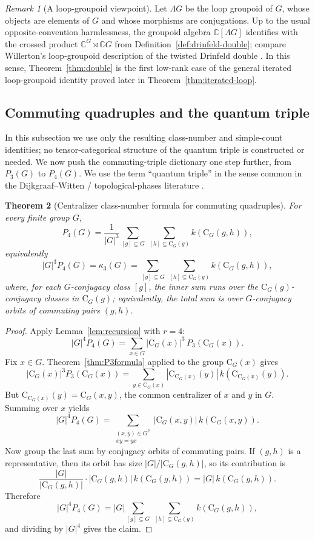 \documentclass[11pt]{article}
\newtheorem{theorem}{Theorem}[section]
\theoremstyle{definition}
\theoremstyle{remark}
\newtheorem{remark}[theorem]{Remark}
\theoremstyle{definition}
\theoremstyle{plain}
\newcommand{\C}{\mathrm{C}}
\begin{document}
\begin{remark}[A loop-groupoid viewpoint]\label{rem:double-as-loopgroupoid}
Let $\Lambda G$ be the loop groupoid of $G$, whose objects are elements of $G$ and whose morphisms are conjugations.
Up to the usual opposite-convention harmlessness, the groupoid algebra $\mathbb C[\Lambda G]$ identifies with the crossed product
$\mathbb C^G\rtimes \mathbb C G$ from Definition~\ref{def:drinfeld-double}; compare Willerton's loop-groupoid description of the twisted Drinfeld double \cite{Willerton2008}. In this sense, Theorem~\ref{thm:double} is the first low-rank case of the general iterated loop-groupoid identity proved later in Theorem~\ref{thm:iterated-loop}.
\end{remark}

\subsection{Commuting quadruples and the quantum triple}

In this subsection we use only the resulting class-number and simple-count identities; no tensor-categorical structure of the quantum triple is constructed or needed.
We now push the commuting-triple dictionary one step further, from $P_3(G)$ to $P_4(G)$. We use the term
``quantum triple'' in the sense common in the Dijkgraaf--Witten / topological-phases literature \cite{BullivantDelcamp2019,BullivantDelcampCrossCircle}.

\begin{theorem}[Centralizer class-number formula for commuting quadruples]\label{thm:P4formula}
For every finite group $G$,
\[
P_4(G)=\frac{1}{|G|^3}\sum_{[g]\subseteq G}~\sum_{[h]\subseteq \C_G(g)} k(\C_G(g,h)),
\]
equivalently
\[
|G|^3P_4(G)=\kappa_3(G)=\sum_{[g]\subseteq G}~\sum_{[h]\subseteq \C_G(g)} k(\C_G(g,h)),
\]
where, for each $G$-conjugacy class $[g]$, the inner sum runs over the $\C_G(g)$-conjugacy classes in $\C_G(g)$; equivalently, the total sum is over $G$-conjugacy orbits of commuting pairs $(g,h)$.
\end{theorem}

\begin{proof}
Apply Lemma~\ref{lem:recursion} with $r=4$:
\[
|G|^4P_4(G)=\sum_{x\in G} |\C_G(x)|^3\,P_3(\C_G(x)).
\]
Fix $x\in G$.
Theorem~\ref{thm:P3formula} applied to the group $\C_G(x)$ gives
\[
|\C_G(x)|^3P_3(\C_G(x))=\sum_{y\in \C_G(x)} |\C_{\C_G(x)}(y)|\,k(\C_{\C_G(x)}(y)).
\]
But $\C_{\C_G(x)}(y)=\C_G(x,y)$, the common centralizer of $x$ and $y$ in $G$.
Summing over $x$ yields
\[
|G|^4P_4(G)=\sum_{\substack{(x,y)\in G^2\\ xy=yx}} |\C_G(x,y)|\,k(\C_G(x,y)).
\]
Now group the last sum by conjugacy orbits of commuting pairs.
If $(g,h)$ is a representative, then its orbit has size $|G|/|\C_G(g,h)|$, so its contribution is
\[
\frac{|G|}{|\C_G(g,h)|}\cdot |\C_G(g,h)|\,k(\C_G(g,h))=|G|\,k(\C_G(g,h)).
\]
Therefore
\[
|G|^4P_4(G)=|G|\sum_{[g]\subseteq G}~\sum_{[h]\subseteq \C_G(g)} k(\C_G(g,h)),
\]
and dividing by $|G|^4$ gives the claim.
\end{proof}
\end{document}
